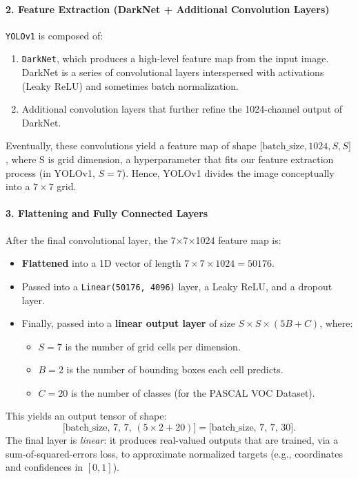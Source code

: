 \begin{enrichment}
\begin{enrichment}
    \paragraph{2. Feature Extraction (DarkNet + Additional Convolution Layers)}
      \texttt{YOLOv1} is composed of:
    \begin{enumerate}
        \item \texttt{DarkNet}, which produces a high-level feature map from the input image. DarkNet is a series of convolutional layers interspersed with activations (Leaky ReLU) and sometimes batch normalization.
        \item Additional convolution layers that further refine the 1024-channel output of DarkNet.
    \end{enumerate}
    Eventually, these convolutions yield a feature map of shape \(\bigl[\text{batch\_size}, 1024, S, S\bigr]\), where S is grid dimension, a hyperparameter that fits our feature extraction process (in YOLOv1, $S=7$). Hence, YOLOv1 divides the image conceptually into a \(7\times7\) grid.
    
    \paragraph{3. Flattening and Fully Connected Layers}
    After the final convolutional layer, the 7\(\times\)7\(\times\)1024 feature map is:
    \begin{itemize}
    	\item \textbf{Flattened} into a 1D vector of length \(7 \times 7 \times 1024 = 50176\).
    	\item Passed into a \texttt{Linear(50176, 4096)} layer, a Leaky ReLU, and a dropout layer.
    	\item Finally, passed into a \textbf{linear output layer} of size \(S \times S \times (5B + C)\), where:
    	\begin{itemize}
    		\item \(S=7\) is the number of grid cells per dimension.
    		\item \(B=2\) is the number of bounding boxes each cell predicts.
    		\item \(C=20\) is the number of classes (for the PASCAL VOC Dataset).
    	\end{itemize}
    \end{itemize}
    This yields an output tensor of shape:
    \[
    \bigl[\text{batch\_size},\,7,\,7,\,(5 \times 2 + 20)\bigr] = \bigl[\text{batch\_size},\,7,\,7,\,30\bigr].
    \]
    The final layer is \emph{linear}: it produces real-valued outputs that are trained, via a sum-of-squared-errors loss, to approximate normalized targets (e.g., coordinates and confidences in \([0,1]\)).
    

\end{enrichment}
\end{enrichment}
